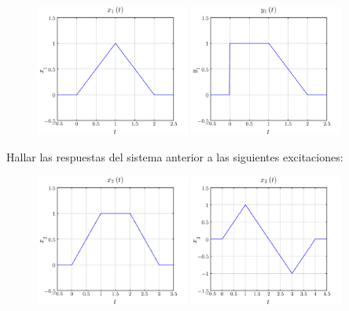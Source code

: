 \documentclass[a4paper,12pt,final]{article}
\begin{document}
    \begin{figure}[H]
      \begin{center}
        \includegraphics[width=0.45\textwidth]{./laboratorio_3/problema02_X1.png}
        \includegraphics[width=0.45\textwidth]{./laboratorio_3/problema02_Y1.png}
      \end{center}
    \end{figure}

    \noindent Hallar las respuestas del sistema anterior a las siguientes excitaciones:

    \begin{figure}[H]
      \begin{center}
        \includegraphics[width=0.45\textwidth]{./laboratorio_3/problema02_X2.png}
        \includegraphics[width=0.45\textwidth]{./laboratorio_3/problema02_X3.png}
      \end{center}
    \end{figure}
\end{document}
